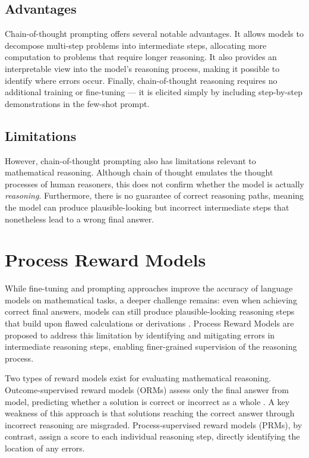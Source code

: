 \subsection*{Advantages}
Chain-of-thought prompting offers several notable
  advantages. It allows models to
  decompose multi-step problems into intermediate steps,
  allocating more computation to problems that require
  longer reasoning. It also provides an interpretable
  view into the model's reasoning process, making it
  possible to identify where errors occur. Finally, chain-of-thought reasoning
  requires no additional training or fine-tuning ---
  it is elicited simply by including step-by-step
  demonstrations in the few-shot prompt.

\subsection*{Limitations}
However, chain-of-thought prompting also has
  limitations relevant to mathematical reasoning. Although chain of thought emulates
  the thought processes of human reasoners, this does
  not confirm whether the model is actually
  \textit{reasoning}. Furthermore, there is no
  guarantee of correct reasoning paths, meaning the
  model can produce plausible-looking but incorrect
  intermediate steps that nonetheless lead to a wrong
  final answer.
\section{Process Reward Models}
\label{sec:prm}
  While fine-tuning and prompting approaches improve the
  accuracy of language models on mathematical tasks, a
  deeper challenge remains: even when achieving correct
  final answers, models can still produce plausible-looking
  reasoning steps that build upon flawed calculations or
  derivations \cite{qwen2025prm}. Process Reward Models \cite{lightman2024} are
  proposed to address this limitation by identifying and
  mitigating errors in intermediate reasoning steps,
  enabling finer-grained supervision of the reasoning
  process.


Two types of reward models exist for evaluating
  mathematical reasoning. Outcome-supervised reward
  models (ORMs) assess only the final answer from model, predicting
  whether a solution is correct or incorrect as a whole
  . A key weakness of this approach
  is that solutions reaching the correct answer through
  incorrect reasoning are misgraded. Process-supervised
  reward models (PRMs), by contrast, assign a score to
  each individual reasoning step, directly identifying
  the location of any errors.

